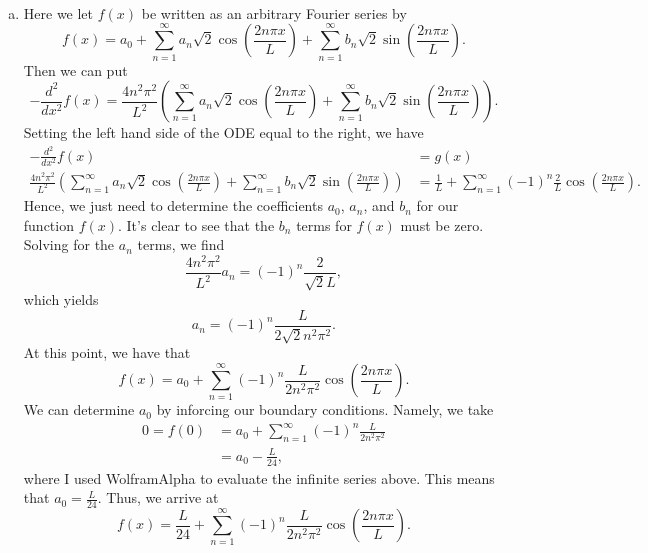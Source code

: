 \documentclass[12pt]{article} %
\begin{document}
\begin{solution}~
	\begin{enumerate}[(a)]
		\item	Here we let $f(x)$ be written as an arbitrary Fourier series by
		\[
			f(x) = a_0 + \sum_{n=1}^\infty a_n \sqrt{2} \cos\left(\frac{2n \pi x}{L}\right) + \sum_{n=1}^\infty b_n \sqrt{2}\sin\left(\frac{2n\pi x}{L}\right).
		\]
		Then we can put
		\[
		-\frac{d^2}{dx^2} f(x) = \frac{4n^2\pi^2}{L^2} \left(\sum_{n=1}^\infty a_n \sqrt{2} \cos\left(\frac{2n \pi x}{L}\right) + \sum_{n=1}^\infty b_n \sqrt{2}\sin\left(\frac{2n\pi x}{L}\right)\right).
		\]
		Setting the left hand side of the ODE equal to the right, we have
		\begin{align*}
			-\frac{d^2}{dx^2}f(x) &= g(x)\\
			\frac{4n^2\pi^2}{L^2} \left(\sum_{n=1}^\infty a_n \sqrt{2} \cos\left(\frac{2n \pi x}{L}\right) + \sum_{n=1}^\infty b_n \sqrt{2}\sin\left(\frac{2n\pi x}{L}\right)\right) &= \frac{1}{L} + \sum_{n=1}^\infty (-1)^n \frac{2}{L} \cos\left(\frac{2n\pi x}{L}\right).
		\end{align*}
		Hence, we just need to determine the coefficients $a_0$, $a_n$, and $b_n$ for our function $f(x)$. It's clear to see that the $b_n$ terms for $f(x)$ must be zero. Solving for the $a_n$ terms, we find
		\[
		\frac{4n^2\pi^2}{L^2} a_n= (-1)^n \frac{2}{\sqrt{2}L},
		\]
		which yields
		\[
		a_n = (-1)^n \frac{L}{2\sqrt{2}n^2\pi^2}.
		\]
		At this point, we have that
		\[
		f(x) = a_0 + \sum_{n=1}^\infty (-1)^n \frac{L}{2n^2\pi^2}\cos\left(\frac{2n\pi x}{L}\right).
		\]
		We can determine $a_0$ by inforcing our boundary conditions. Namely, we take
		\begin{align*}
		0=f(0)&= a_0 + \sum_{n=1}^\infty (-1)^n \frac{L}{2n^2\pi^2}\\
		&=a_0 -\frac{L}{24},
		\end{align*}
		where I used WolframAlpha to evaluate the infinite series above.  This means that $a_0 = \frac{L}{24}$. Thus, we arrive at
		\[
		\boxed{f(x) = \frac{L}{24} + \sum_{n=1}^\infty (-1)^n \frac{L}{2n^2\pi^2}\cos\left(\frac{2n\pi x}{L}\right).}
		\]
	\end{enumerate}
\end{solution}
\end{document}
